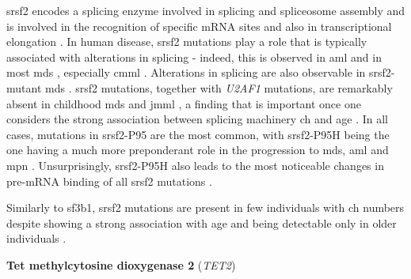 \Ac{srsf2} encodes a splicing enzyme involved in splicing and spliceosome assembly \cite{Fu1992-wy} and is involved in the recognition of specific mRNA sites \cite{Liu2000-ax} and also in transcriptional elongation \cite{Lin2008-tj}. In human disease, \ac{srsf2} mutations play a role that is typically associated with alterations in splicing - indeed, this is observed in \ac{aml} \cite{Yoshimi2019-ax} and in most \ac{mds} \cite{Yoshida2011-zp,Makishima2012-wr}, especially \ac{cmml} \cite{Patnaik2013-cv,Meggendorfer2012-jn}. Alterations in splicing are also observable in \ac{srsf2}-mutant \ac{mds} \cite{Rahman2020-bh}. \ac{srsf2} mutations, together with \textit{U2AF1} mutations, are remarkably absent in childhood \ac{mds} and \ac{jmml} \cite{Hirabayashi2012-jj,Kar2013-nw}, a finding that is important once one considers  the strong association between splicing machinery \ac{ch} and age \cite{Yoshida2011-zp}. In all cases, mutations in \ac{srsf2}-P95 are the most common, with \ac{srsf2}-P95H being the one having a much more preponderant role in the progression to \ac{mds}, \ac{aml} and \ac{mpn} \cite{Wang2021-wg,Smeets2018-yv,Nagata2019-hn}. Unsurprisingly, \ac{srsf2}-P95H also leads to the most noticeable changes in pre-mRNA binding of all \ac{srsf2} mutations \cite{Zhang2015-xu,Komeno2015-pq}.

Similarly to \ac{sf3b1}, \ac{srsf2} mutations are present in few individuals with \ac{ch} numbers \cite{Bolton2020-ct,Genovese2014-eu,Zink2017-zi,McKerrell2015-rl} despite showing a strong association with age and being detectable only in older individuals \cite{Bolton2020-ct,McKerrell2015-rl}.

\noindent \textbf{Tet methylcytosine dioxygenase 2} (\textit{TET2})

